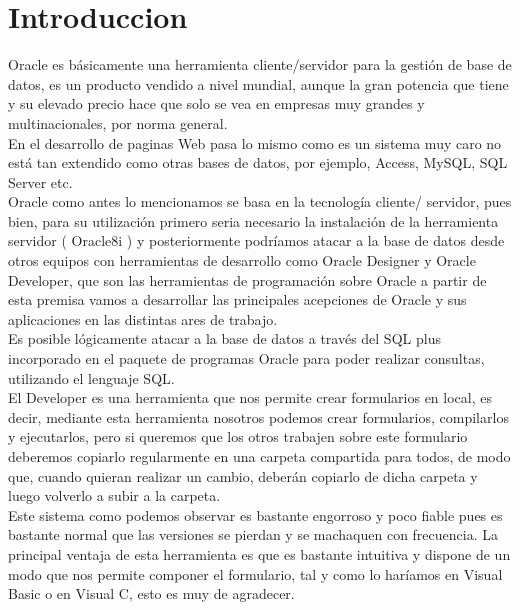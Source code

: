 \section{Introduccion}
\vspace{12pt}

Oracle es básicamente una herramienta cliente/servidor para la gestión de base de datos, es un producto vendido a nivel mundial, aunque la gran potencia que tiene y su elevado precio hace que solo se vea en empresas muy grandes y multinacionales, por norma general.
\vspace{12pt}\\
En el desarrollo de paginas Web pasa lo mismo como es un sistema muy caro no está tan extendido como otras bases de datos, por ejemplo, Access, MySQL, SQL Server etc.
\vspace{12pt}\\
Oracle como antes lo mencionamos se basa en la tecnología cliente/ servidor, pues bien, para su utilización primero seria necesario la instalación de la herramienta servidor ( Oracle8i ) y posteriormente podríamos atacar a la base de datos desde otros equipos con herramientas de desarrollo como Oracle Designer y Oracle Developer, que son las herramientas de programación sobre Oracle a partir de esta premisa vamos a desarrollar las principales acepciones de Oracle y sus aplicaciones en las distintas ares de trabajo.
\vspace{12pt}\\
Es posible lógicamente atacar a la base de datos a través del SQL plus incorporado en el paquete de programas Oracle para poder realizar consultas, utilizando el lenguaje SQL.
\vspace{12pt}\\
El Developer es una herramienta que nos permite crear formularios en local, es decir, mediante esta herramienta nosotros podemos crear formularios, compilarlos y ejecutarlos, pero si queremos que los otros trabajen sobre este formulario deberemos copiarlo regularmente en una carpeta compartida para todos, de modo que, cuando quieran realizar un cambio, deberán copiarlo de dicha carpeta y luego volverlo a subir a la carpeta.
\vspace{12pt}\\
Este sistema como podemos observar es bastante engorroso y poco fiable pues es bastante normal que las versiones se pierdan y se machaquen con frecuencia. La principal ventaja de esta herramienta es que es bastante intuitiva y dispone de un modo que nos permite componer el formulario, tal y como lo haríamos en Visual Basic o en Visual C, esto es muy de agradecer.

